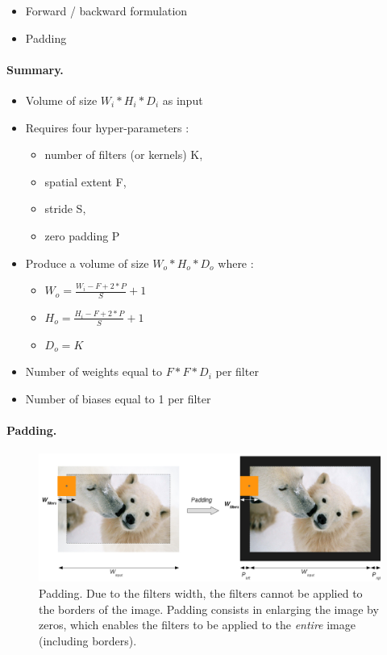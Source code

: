 \begin{itemize}
 \item Forward / backward formulation
 \item Padding
\end{itemize}

\paragraph{Summary. }
\begin{itemize}
	\item Volume of size $W_i*H_i*D_i$ as input
	\item Requires four hyper-parameters :
    \begin{itemize}
    	\item number of filters (or kernels) K,
        \item spatial extent F,
        \item stride S,
        \item zero padding P
    \end{itemize}
	\item Produce a volume of size $W_o*H_o*D_o$ where :
    \begin{itemize}
		\item $W_o = \frac{W_i - F + 2*P}{S} + 1$
		\item $H_o = \frac{H_i - F + 2*P}{S} + 1$
		\item $D_o = K$
    \end{itemize}
    \item Number of weights equal to $F*F*D_i$ per filter
    \item Number of biases equal to 1 per filter
\end{itemize}


\paragraph{Padding. }

\begin{figure}
 \begin{center}
  \includegraphics[width=16cm]{images/padding.png}
 \end{center}
  \caption{
  \label{fig:padding}
  Padding. Due to the filters width, the filters cannot be applied to the borders of the image. Padding consists in enlarging the 
  image by zeros, which enables the filters to be applied to the \textit{entire} image (including borders). 
  }
\end{figure}

